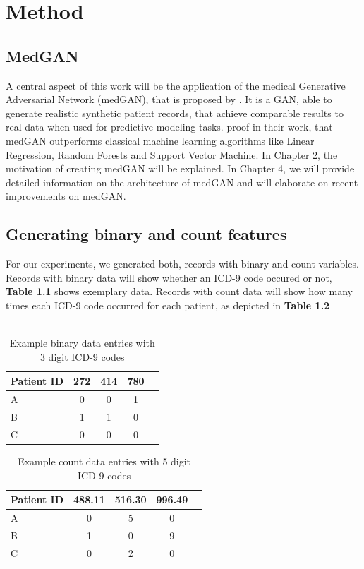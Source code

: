 \documentclass[11pt, a4paper]{book}
\begin{document}
\section{Method}



\subsection{MedGAN}
A central aspect of this work will be the application of the medical Generative Adversarial Network (medGAN), that is proposed by \cite{Choi2017}.
It is a GAN, able to generate realistic synthetic patient records, that achieve comparable results to real data when used for predictive modeling tasks. \cite{Choi2017} proof in their work, that medGAN outperforms classical machine learning algorithms like Linear Regression, Random Forests and Support Vector Machine. 
In Chapter 2, the motivation of creating medGAN will be explained. In Chapter 4, we will provide detailed information on the architecture of medGAN and will elaborate on recent improvements on medGAN.
\subsection{Generating binary and count features}
For our experiments, we generated both, records with binary and count variables. Records with binary data will show whether an ICD-9 code occured or not, \textbf{Table 1.1} shows exemplary data. Records with count data will show how many times each ICD-9 code occurred for each patient, as depicted in \textbf{Table 1.2}
\\
\\

\begin{table}
\begin{center}
\begin{tabular}{l*{3}{c}r }
Patient ID & 272 & 414 & 780 \\
\hline
A & 0 & 0 & 1 \\
B & 1 & 1 & 0 \\
C & 0 & 0 & 0 \\
\hline
\end{tabular}
\caption{Example binary data entries with 3 digit ICD-9 codes}
\end{center}
\end{table}


\begin{table}
\begin{center}
\begin{tabular}{l*{3}{c}r }
Patient ID & 488.11 & 516.30 & 996.49 \\
\hline
A & 0 & 5 & 0 \\
B & 1 & 0 & 9 \\
C & 0 & 2 & 0 \\
\hline
\end{tabular}
\caption{Example count data entries with 5 digit ICD-9 codes}
\end{center}
\end{table}
\end{document}
